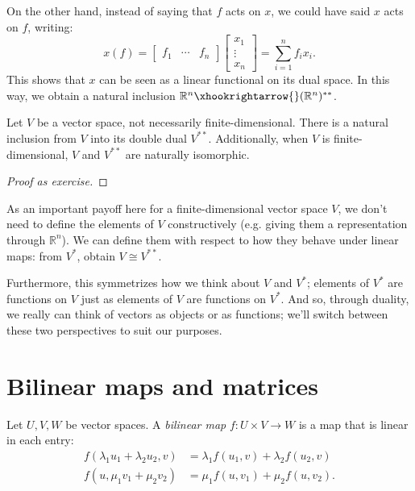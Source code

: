 On the other hand, instead of saying that $f$ acts on $x$, we could have said $x$ acts on $f$, writing:
\[x(f) = \begin{bmatrix} f_1 & \dotsm & f_n \end{bmatrix} \begin{bmatrix} x_1 \\ \vdots \\ x_n \end{bmatrix} = \sum_{i=1}^n f_i x_i.\]
This shows that $x$ can be seen as a linear functional on its dual space. In this way, we obtain a natural inclusion $\mathbb{R}^n \xhookrightarrow{} (\mathbb{R}^n)^{**}$.
\begin{proposition}
  Let $V$ be a vector space, not necessarily finite-dimensional. There is a natural inclusion from $V$ into its double dual $V^{**}$. Additionally, when $V$ is finite-dimensional, $V$ and $V^{**}$ are naturally isomorphic.
\end{proposition}
\begin{proof}[Proof as exercise]
\end{proof}

As an important payoff here for a finite-dimensional vector space $V$, we don't need to define the elements of $V$ constructively (e.g. giving them a representation through $\mathbb{R}^n$). We can define them with respect to how they behave under linear maps: from $V^*$, obtain $V \cong V^{**}$.

Furthermore, this symmetrizes how we think about $V$ and $V^*$; elements of $V^*$ are functions on $V$ just as elements of $V$ are functions on $V^*$. And so, through duality, we really can think of vectors as objects or as functions; we'll switch between these two perspectives to suit our purposes.

\section{Bilinear maps and matrices}
\begin{definition}
Let $U,V, W$ be vector spaces. A \emph{bilinear map} $f : U \times V \to W$ is a map that is linear in each entry:
\begin{align*} f(\lambda_1 u_1 + \lambda_2 u_2, v) &= \lambda_1 f(u_1, v) + \lambda_2 f(u_2, v)\\
f(u,\mu_1 v_1 + \mu_2 v_2) &= \mu_1 f(u,v_1) + \mu_2 f(u,v_2).\end{align*}
\end{definition}

